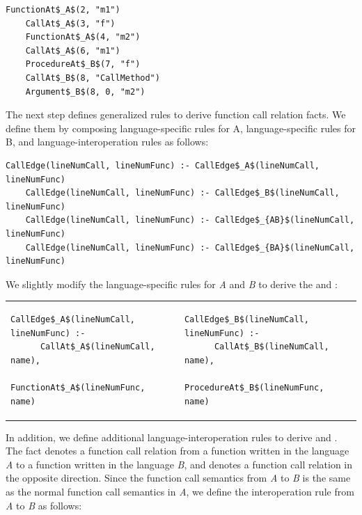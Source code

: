 \begin{lstlisting}[style=mrule]
    FunctionAt$_A$(2, "m1")
    CallAt$_A$(3, "f")
    FunctionAt$_A$(4, "m2")
    CallAt$_A$(6, "m1")
    ProcedureAt$_B$(7, "f")
    CallAt$_B$(8, "CallMethod")
    Argument$_B$(8, 0, "m2")
\end{lstlisting}


The next step defines generalized rules to derive function call relation
facts. We define them by composing language-specific rules for A,
language-specific rules for B, and language-interoperation rules as follows:

\begin{lstlisting}[style=mrule]
    CallEdge(lineNumCall, lineNumFunc) :- CallEdge$_A$(lineNumCall, lineNumFunc)
    CallEdge(lineNumCall, lineNumFunc) :- CallEdge$_B$(lineNumCall, lineNumFunc)
    CallEdge(lineNumCall, lineNumFunc) :- CallEdge$_{AB}$(lineNumCall, lineNumFunc)
    CallEdge(lineNumCall, lineNumFunc) :- CallEdge$_{BA}$(lineNumCall, lineNumFunc)
\end{lstlisting}


\noindent 
We slightly modify the language-specific rules for {\it A} and {\it B} to
derive the  and :

\begin{tabular}{ll}
  {\begin{lstlisting}[style=mrule]
    CallEdge$_A$(lineNumCall, lineNumFunc) :-
      CallAt$_A$(lineNumCall, name),
      FunctionAt$_A$(lineNumFunc, name)
  \end{lstlisting}} & 
  {\begin{lstlisting}[style=mrule]
    CallEdge$_B$(lineNumCall, lineNumFunc) :-
      CallAt$_B$(lineNumCall, name),
      ProcedureAt$_B$(lineNumFunc, name)
  \end{lstlisting}}
\end{tabular}

\noindent
In addition, we define additional language-interoperation rules to derive  and . The fact  denotes a function call relation from a function written in
the language {\it A} to a function written in the language {\it B}, and  denotes a function call relation in the opposite direction.
Since the function call semantics from {\it A} to {\it B} is the same as the
normal function call semantics in {\it A}, we define the interoperation rule from {\it
A} to {\it B} as follows: 

